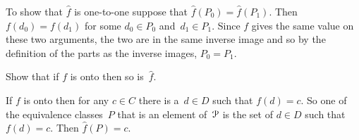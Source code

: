 \documentclass{ibl}  %
\begin{document}
\begin{problem}
\begin{exes}
\begin{answer}
  To show that $\hat{f}$ is one-to-one suppose that $\hat{f}(P_0)=\hat{f}(P_1)$.
  Then $f(d_0)=f(d_1)$ for some $d_0\in P_0$ and~$d_1\in P_1$.
  Since $f$ gives the same value on these two arguments,
  the two are in the same inverse image and so  
  by the definition of the parts as the inverse images,
  $P_0=P_1$.  
\end{answer}
\begin{exercise} 
  Show that if $f$ is onto then so is~$\hat{f}$.
\end{exercise}
\begin{answer}
  If $f$ is onto then for any $c\in C$ there is a~$d\in D$
  such that $f(d)=c$.
  So one of the equivalence classes~$P$ that is an element of~$\EuScript{P}$ 
  is the set of 
  $d\in D$ such that $f(d)=c$.
  Then $\hat{f}(P)=c$.  
\end{answer}
\end{exes}


\end{problem}
\end{document}
